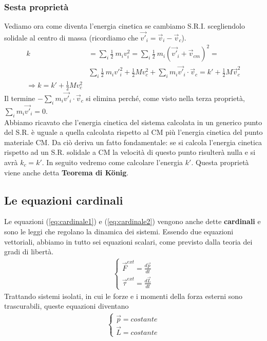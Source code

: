 \subsubsection{Sesta proprietà}
Vediamo ora come diventa l'energia cinetica se cambiamo S.R.I. scegliendolo solidale al centro di massa (ricordiamo che $ \vec{v'}_i= \vec{v}_i-\vec{v}_c$).
\begin{align}\label{eq:sestaproprietà}
k &= \sum_i \frac{1}{2}\ m_i {v}^{ 2}_i= \sum_i  \frac{1}{2}\ m_i (\vec{v'}_i+\vec{v}_{cm})^{2} =\\ \nonumber
& \sum_i \frac{1}{2}\ m_i {v'}_i^2 + \frac{1}{2} M v_{c}^2 + \sum_i m_i \vec{v'}_i \cdot \vec{v}_c = k' + \frac{1}{2} M \vec{v}^{2}_c\\ \nonumber
\Rightarrow k = k' + \frac{1}{2}M v_c^2
\end{align}
Il termine $- \sum_i m_i \vec{v'}_i \cdot \vec{v}_c$ si elimina perché, come visto nella terza proprietà, $ \sum_i m_i \vec{v'}_i = 0$.\\
Abbiamo ricavato che l'energia cinetica del sistema calcolata in un generico punto del S.R. è uguale a quella calcolata rispetto al CM più l'energia cinetica del punto materiale CM. Da ciò deriva un fatto fondamentale: se si calcola l'energia cinetica rispetto ad un S.R. solidale a CM la velocità di questo punto risulterà nulla e si avrà $k_c= k'$. In seguito vedremo come calcolare l'energia $k'$. Questa proprietà viene anche detta \textbf{Teorema di K\"{o}nig}.

\subsection{Le equazioni cardinali}
Le equazioni (\ref{eq:cardinale1}) e (\ref{eq:cardinale2}) vengono anche dette \textbf{cardinali} e sono le leggi che regolano la dinamica dei sistemi. Essendo due equazioni vettoriali, abbiamo in tutto sei equazioni scalari, come previsto dalla teoria dei gradi di libertà.
\begin{align*}
\begin{cases}
	\vec{F}^{ext} = {\frac{d\vec{p}}{dt}}\\
	\vec{\tau}^{ext} =\frac{d\vec{L}}{dt}
\end{cases}
\end{align*}
Trattando sistemi isolati, in cui le forze e i momenti della forza esterni sono trascurabili, queste equazioni diventano
\begin{align*}
	\begin{cases}
	\vec{p} = costante\\
	\vec{L} = costante
	\end{cases}
\end{align*}
